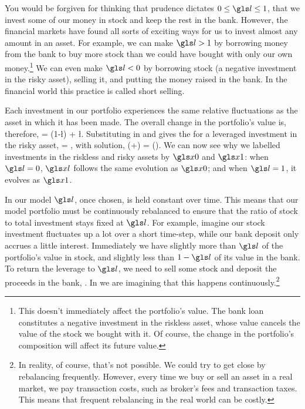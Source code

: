 You would be forgiven for thinking that prudence dictates $0\leq\l\leq1$, \ie that we invest some of our money in stock and keep the rest in the bank. However, the financial markets have found all sorts of exciting ways for us to invest almost any amount in an asset. For example, we can make $\l>1$ by borrowing money from the bank to buy more stock than we could have bought with only our own money.\footnote{This doesn't immediately affect the portfolio's value. The bank loan constitutes a negative investment in the riskless asset, whose value cancels the value of the stock we bought with it. Of course, the change in the portfolio's composition will affect its future value.} We can even make $\l<0$ by borrowing stock (a negative investment in the risky asset), selling it, and putting the money raised in the bank. In the financial world this practice is called short selling.

Each investment in our portfolio experiences the same relative fluctuations as the asset in which it has been made. The overall change in the portfolio's value is, therefore,
\be
\gd\xl = (1-\l)\xl \frac{\gd\xzero}{\xzero} + \l \xl \frac{\gd\xone}{\xone}.
\ee
Substituting in  and  gives the \SDE for a leveraged investment in the risky asset,
\be
\gd\xl = \xl [ (\mur + \l\mue) \gd\t + \l\sigmas \gd\gW ],
\ee
with solution,
\be
\xl(\tn+\Dt) = \xl(\tn)\exp{}.
\ee
We can now see why we labelled investments in the riskless and risky assets by $\xzero$ and $\xone$: when $\l=0$, $\xl$ follows the same evolution as $\xzero$; and when $\l=1$, it evolves as $\xone$.

In our model $\l$, once chosen, is held constant over time. This means that our model portfolio must be continuously rebalanced to ensure that the ratio of stock to total investment stays fixed at $\l$. For example, imagine our stock investment fluctuates up a lot over a short time-step, while our bank deposit only accrues a little interest. Immediately we have slightly more than $\l$ of the portfolio's value in stock, and slightly less than $1-\l$ of its value in the bank. To return the leverage to $\l$, we need to sell some stock and deposit the proceeds in the bank, . In  we are imagining that this happens continuously.\footnote{In reality, of course, that's not possible. We could try to get close by rebalancing frequently. However, every time we buy or sell an asset in a real market, we pay transaction costs, such as broker's fees and transaction taxes. This means that frequent rebalancing in the real world can be costly.}

